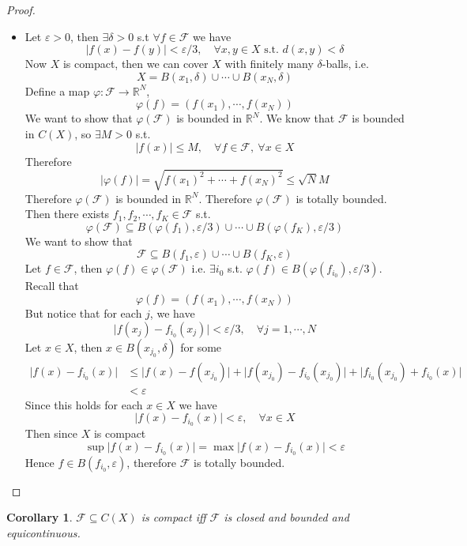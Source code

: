 \documentclass[11pt,a4paper]{article}
\theoremstyle{definition}
\theoremstyle{plain}
\newtheorem{corollary}[definition]{Corollary}
\theoremstyle{remark}
\newcommand{\R}{\mathbb{R}}
\newcommand{\abs}[1]{\lvert #1 \rvert}
\newcommand{\1}{\mathbbm{1}}
\begin{document}
\begin{proof}
\begin{itemize}
        \item[$\impliedby$] Let $\varepsilon > 0$, then $\exists \delta > 0$ s.t $\forall f \in \mathcal{F}$ we have 
        $$\abs{f(x) - f(y)} < \varepsilon/3, \quad \forall x,y \in X \text{ s.t. } d(x,y) < \delta$$
        Now $X$ is compact, then we can cover $X$ with finitely many $\delta$-balls, i.e.
        $$X = B(x_1, \delta) \cup \cdots \cup B(x_N, \delta)$$
        Define a map $\varphi \colon \mathcal{F} \to \R^N$, 
        $$\varphi(f) = (f(x_1), \cdots, f(x_N))$$
        We want to show that $\varphi(\mathcal{F})$ is bounded in $\R^N$. We know that $\mathcal{F}$ is bounded in $C(X)$, so $\exists M > 0$ s.t. 
        $$\abs{f(x)} \le M, \quad \forall f \in \mathcal{F}, \ \forall x \in X$$
        Therefore 
        $$\abs{\varphi(f)} = \sqrt{f(x_1)^2 + \cdots + f(x_N)^2} \le \sqrt{N} M$$
        Therefore $\varphi(\mathcal{F})$ is bounded in $\R^N$. Therefore $\varphi(\mathcal{F})$ is totally bounded. Then 
        there exists $f_1, f_2, \cdots, f_K \in \mathcal{F}$ s.t. 
        $$\varphi(\mathcal{F}) \subseteq B(\varphi(f_1), \varepsilon/3) \cup \cdots \cup B(\varphi(f_K), \varepsilon/3)$$
        We want to show that 
        $$\mathcal{F} \subseteq B(f_1, \varepsilon) \cup \cdots \cup B(f_K, \varepsilon)$$
        Let $f \in \mathcal{F}$, then $\varphi(f) \in \varphi(\mathcal{F})$ i.e. $\exists i_{0}$ s.t. 
        $\varphi(f) \in B(\varphi(f_{i_0}), \varepsilon/3)$. Recall that 
        $$\varphi(f) = (f(x_1), \cdots, f(x_N))$$
        But notice that for each $j$, we have 
        $$\abs{f(x_j) - f_{i_0}(x_j)} < \varepsilon / 3, \quad \forall j =1, \cdots, N$$
        Let $x \in X$, then $x \in B(x_{j_0}, \delta)$ for some  
        \begin{align*}
            \abs{f(x) - f_{i_0}(x)} &\le \abs{f(x) - f(x_{j_0})} + \abs{f(x_{j_0}) - f_{i_0}(x_{j_0})} + \abs{f_{i_0}(x_{j_0}) + f_{i_0}(x)} \\
            &< \varepsilon
        \end{align*} 
        Since this holds for each $x \in X$ we have 
        $$\abs{f(x) - f_{i_0}(x)} < \varepsilon, \quad \forall x \in X$$
        Then since $X$ is compact
        $$\sup \abs{f(x) - f_{i_0}(x)} = \max \abs{f(x) - f_{i_0}(x)} < \varepsilon$$
        Hence $f \in B(f_{i_0}, \varepsilon)$, therefore $\mathcal{F}$ is totally bounded. 
    \end{itemize}
\end{proof}

\begin{corollary}
    $\mathcal{F} \subseteq C(X)$ is compact iff $\mathcal{F}$ is closed and bounded and equicontinuous.
\end{corollary}
\end{document}

